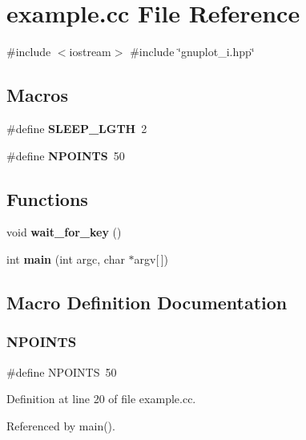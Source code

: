\section{example.\+cc File Reference}
\label{example_8cc}
{\ttfamily \#include $<$iostream$>$}\newline
{\ttfamily \#include \char`\"{}gnuplot\+\_\+i.\+hpp\char`\"{}}\newline
\subsection*{Macros}
\begin{DoxyCompactItemize}
\item 
\#define \textbf{ S\+L\+E\+E\+P\+\_\+\+L\+G\+TH}~2
\item 
\#define \textbf{ N\+P\+O\+I\+N\+TS}~50
\end{DoxyCompactItemize}
\subsection*{Functions}
\begin{DoxyCompactItemize}
\item 
void \textbf{ wait\+\_\+for\+\_\+key} ()
\item 
int \textbf{ main} (int argc, char $\ast$argv[$\,$])
\end{DoxyCompactItemize}


\subsection{Macro Definition Documentation}
\mbox{\label{example_8cc_a046c61fd31a06b2051fa0f57e626ee65}} 
\subsubsection{N\+P\+O\+I\+N\+TS}
{\footnotesize\ttfamily \#define N\+P\+O\+I\+N\+TS~50}



Definition at line 20 of file example.\+cc.



Referenced by main().

\mbox{\label{example_8cc_a86c9f48acee3e4ad980ffbaacc293a1a}} 
